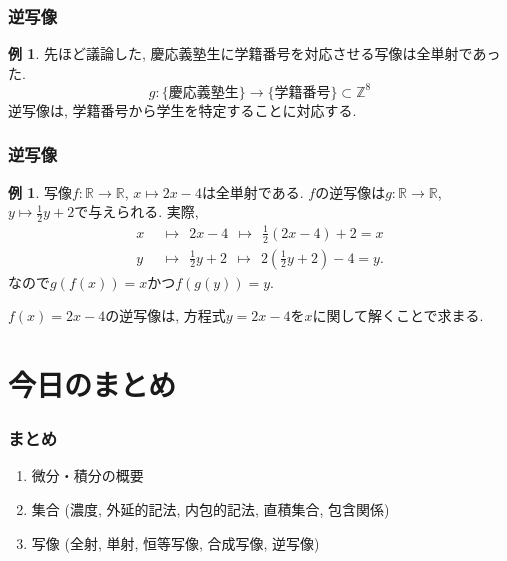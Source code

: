 \documentclass[dvipdfmx,cjk,10.2pt]{beamer}
\newcommand{\R}{\mathbb{R}}
\newcommand{\Z}{\mathbb{Z}}
\theoremstyle{definition}
\newtheorem{Ex}[Thm]{例}
\begin{document}
\begin{frame}
\frametitle{逆写像}


\begin{Ex}
先ほど議論した, 慶応義塾生に学籍番号を対応させる写像は全単射であった. 
$$
g:\{ \text{慶応義塾生}\} \longrightarrow \{ \text{学籍番号}\} \subset \Z^8
$$
逆写像は, 学籍番号から学生を特定することに対応する. 
\end{Ex}


\end{frame}





\begin{frame}
\frametitle{逆写像}



\begin{Ex}
写像$f:\R \rightarrow \R$, $x \mapsto 2x-4$は全単射である. 
$f$の逆写像は$g:\R \rightarrow \R$, $y \mapsto \frac{1}{2}y+2$で与えられる. 
実際, 
\begin{align*}
x & \ \ \mapsto \ \ 2x-4 \ \ \mapsto \ \ \frac{1}{2}(2x-4)+2=x \\
y & \ \ \mapsto \ \ \frac{1}{2}y+2 \ \ \mapsto \ \ 2(\frac{1}{2}y+2)-4 = y. 
\end{align*}
なので$g(f(x))=x$かつ$f(g(y))=y$. 
\end{Ex}
$f(x)=2x-4$の逆写像は, 方程式$y=2x-4$を$x$に関して解くことで求まる. 


\end{frame}








\section{今日のまとめ}
\begin{frame}
\frametitle{まとめ}   



\begin{enumerate}
\item 微分・積分の概要
\item 集合 (濃度, 外延的記法, 内包的記法, 直積集合, 包含関係)
\item 写像 (全射, 単射, 恒等写像, 合成写像, 逆写像)
\end{enumerate}


\end{frame}
\end{document}
